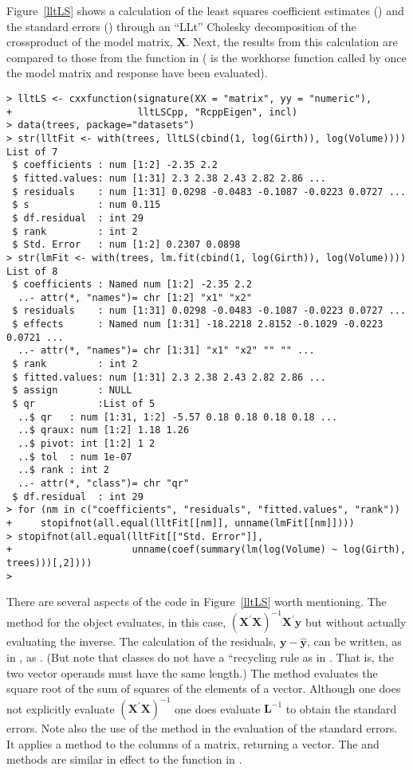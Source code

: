 \documentclass[shortnames,article]{jss}
\begin{document}
Figure~\ref{lltLS} shows a calculation of the least squares coefficient estimates
() and the standard errors () through an
``LLt'' Cholesky decomposition of the crossproduct of the model
matrix, $\bm X$.  Next, the results from this calculation are compared
to those from the  function in 
( is the workhorse function called by  once the
model matrix and response have been evaluated).
\begin{verbatim}
> lltLS <- cxxfunction(signature(XX = "matrix", yy = "numeric"), 
+                      lltLSCpp, "RcppEigen", incl)
> data(trees, package="datasets")
> str(lltFit <- with(trees, lltLS(cbind(1, log(Girth)), log(Volume))))
List of 7
 $ coefficients : num [1:2] -2.35 2.2
 $ fitted.values: num [1:31] 2.3 2.38 2.43 2.82 2.86 ...
 $ residuals    : num [1:31] 0.0298 -0.0483 -0.1087 -0.0223 0.0727 ...
 $ s            : num 0.115
 $ df.residual  : int 29
 $ rank         : int 2
 $ Std. Error   : num [1:2] 0.2307 0.0898
> str(lmFit <- with(trees, lm.fit(cbind(1, log(Girth)), log(Volume))))
List of 8
 $ coefficients : Named num [1:2] -2.35 2.2
  ..- attr(*, "names")= chr [1:2] "x1" "x2"
 $ residuals    : num [1:31] 0.0298 -0.0483 -0.1087 -0.0223 0.0727 ...
 $ effects      : Named num [1:31] -18.2218 2.8152 -0.1029 -0.0223 0.0721 ...
  ..- attr(*, "names")= chr [1:31] "x1" "x2" "" "" ...
 $ rank         : int 2
 $ fitted.values: num [1:31] 2.3 2.38 2.43 2.82 2.86 ...
 $ assign       : NULL
 $ qr           :List of 5
  ..$ qr   : num [1:31, 1:2] -5.57 0.18 0.18 0.18 0.18 ...
  ..$ qraux: num [1:2] 1.18 1.26
  ..$ pivot: int [1:2] 1 2
  ..$ tol  : num 1e-07
  ..$ rank : int 2
  ..- attr(*, "class")= chr "qr"
 $ df.residual  : int 29
> for (nm in c("coefficients", "residuals", "fitted.values", "rank"))
+     stopifnot(all.equal(lltFit[[nm]], unname(lmFit[[nm]])))
> stopifnot(all.equal(lltFit[["Std. Error"]],
+                     unname(coef(summary(lm(log(Volume) ~ log(Girth), trees)))[,2])))
> 
\end{verbatim}


There are several aspects of the  code in
Figure~\ref{lltLS} worth mentioning.  The  method for the
 object evaluates, in this case, $\left(\bm X^\prime\bm
  X\right)^{-1}\bm X^\prime\bm y$ but without actually evaluating the
inverse.  The calculation of the residuals, $\bm y-\widehat{\bm y}$,
can be written, as in , as . (But note
that  classes do not have a ``recycling rule as in
.  That is, the two vector operands must have the same
length.)  The  method evaluates the square root of the
sum of squares of the elements of a vector.  Although one does not
explicitly evaluate $\left(\bm X^\prime\bm X\right)^{-1}$ one does
evaluate $\bm L^{-1}$ to obtain the standard errors.  Note also the
use of the  method in the evaluation of the standard
errors.  It applies a method to the columns of a matrix, returning a
vector.  The   and  methods
are similar in effect to the  function in .
\end{document}
